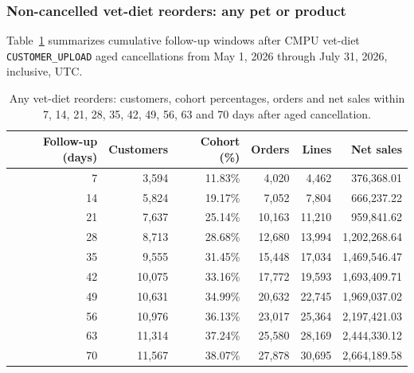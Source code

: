 \clearpage
\subsubsection{Non-cancelled vet-diet reorders: any pet or product}
Table~\ref{tab:financial-opportunity-reorder-any-vet-diet} summarizes cumulative
follow-up windows after CMPU vet-diet \texttt{CUSTOMER\_UPLOAD} aged cancellations
from May 1, 2026 through July 31, 2026, inclusive, UTC.

\begin{table}[!htbp]
\centering
\caption{Any vet-diet reorders: customers, cohort percentages, orders and net sales within 7, 14, 21, 28, 35, 42, 49, 56, 63 and 70 days after aged cancellation.}
\label{tab:financial-opportunity-reorder-any-vet-diet}
\begin{tabular}{@{}rrrrrr@{}}
\toprule
Follow-up (days) & Customers & Cohort (\%) & Orders & Lines & Net sales \\
\midrule
7 & 3,594 & 11.83\% & 4,020 & 4,462 & 376,368.01 \\
14 & 5,824 & 19.17\% & 7,052 & 7,804 & 666,237.22 \\
21 & 7,637 & 25.14\% & 10,163 & 11,210 & 959,841.62 \\
28 & 8,713 & 28.68\% & 12,680 & 13,994 & 1,202,268.64 \\
35 & 9,555 & 31.45\% & 15,448 & 17,034 & 1,469,546.47 \\
42 & 10,075 & 33.16\% & 17,772 & 19,593 & 1,693,409.71 \\
49 & 10,631 & 34.99\% & 20,632 & 22,745 & 1,969,037.02 \\
56 & 10,976 & 36.13\% & 23,017 & 25,364 & 2,197,421.03 \\
63 & 11,314 & 37.24\% & 25,580 & 28,169 & 2,444,330.12 \\
70 & 11,567 & 38.07\% & 27,878 & 30,695 & 2,664,189.58 \\
\bottomrule
\end{tabular}


\end{table}
